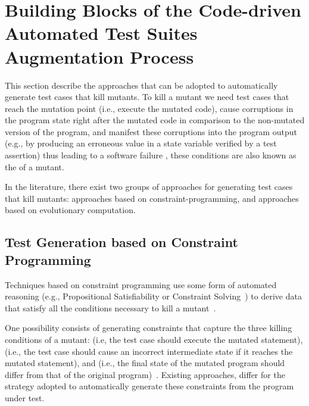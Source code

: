 \clearpage
\section{Building Blocks of the Code-driven Automated Test Suites Augmentation Process}
\label{sec:testGeneration}

This section describe the approaches that can be adopted to automatically generate test cases that kill mutants.
To kill a mutant we need test cases that reach the mutation point (i.e., execute the mutated code), cause 
corruptions
in the program state right after the mutated code in comparison to the non-mutated version of the program, 
and manifest these corruptions into the program output 
(e.g., by producing an erroneous value in a state variable verified by a test assertion) 
thus leading to a software failure \cite{papadakis2019mutation}, these conditions are also known as the  of a mutant.

In the literature, there exist two groups of approaches for 
generating test cases that kill mutants:
approaches based on constraint-programming, and approaches based on evolutionary computation.

\subsection{Test Generation based on Constraint Programming}

Techniques based on constraint programming use some form of automated reasoning (e.g., Propositional Satisfiability or Constraint Solving~\cite{SATandCPsurvey:2006}) to derive data that satisfy all the conditions necessary to kill a mutant~\cite{offutt1997automatically}.

One possibility consists of generating constraints that capture the three killing conditions of a mutant:  (i.e, the test case should execute the mutated statement),  (i.e., the test case should cause an incorrect intermediate state if it reaches the mutated statement), and  (i.e., the final state of the mutated program should differ from that of the original program)~\cite{offutt1997automatically}. Existing approaches, differ for the strategy adopted to automatically generate these constraints from the program under test.

